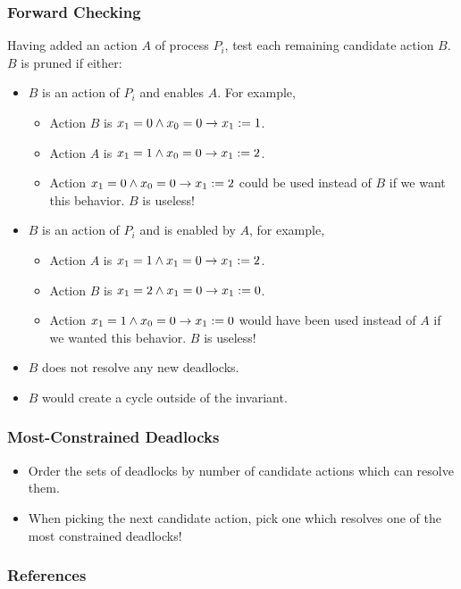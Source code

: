 \documentclass[handout]{beamer}
\begin{document}
\begin{frame}
\frametitle{Forward Checking}
Having added an action $A$ of process $P_i$, test each remaining candidate action $B$.
$B$ is pruned if either:
\begin{itemize}
\item $B$ is an action of $P_i$ and enables $A$. For example,
 \begin{itemize}
 \item[] Action $B$ is $x_1 = 0 \wedge x_0 = 0 \to x_1:= 1$.
 \item[] Action $A$ is $x_1 = 1 \wedge x_0 = 0 \to x_1:= 2$.
 \item Action $x_1 = 0 \wedge x_0 = 0 \to x_1:= 2$ could be used instead of $B$ if we want this behavior. $B$ is useless!
 \end{itemize}
\item $B$ is an action of $P_i$ and is enabled by $A$, for example,
 \begin{itemize}
 \item[] Action $A$ is $x_1 = 1 \wedge x_1 = 0 \to x_1:= 2$.
 \item[] Action $B$ is $x_1 = 2 \wedge x_1 = 0 \to x_1:= 0$.
 \item Action $x_1 = 1 \wedge x_0 = 0 \to x_1:= 0$ would have been used instead of $A$ if we wanted this behavior. $B$ is useless!
 \end{itemize}
\item $B$ does not resolve any new deadlocks.
\item $B$ would create a cycle outside of the invariant.
\end{itemize}
\end{frame}

\begin{frame}
\frametitle{Most-Constrained Deadlocks}
\begin{itemize}
\item Order the sets of deadlocks by number of candidate actions which can resolve them.
\item When picking the next candidate action, pick one which resolves one of the most constrained deadlocks!
\end{itemize}
\end{frame}


\begin{frame}[allowframebreaks]
\frametitle{References}


\end{frame}
\end{document}

